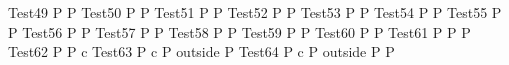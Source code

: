 \documentclass{article}
\begin{document}
\begin{circus}
   \circprocess Test49 \circdef P  P
   \also
   \circprocess Test50 \circdef P  P
   \also
   \circprocess Test51 \circdef P  P
   \also
   \circprocess Test52 \circdef P  P
   \also
   \circprocess Test53 \circdef P  P
   \also
   \circprocess Test54 \circdef P  P
   \also
   \circprocess Test55 \circdef P  P
   \also
   \circprocess Test56 \circdef P  P
   \also
   \circprocess Test57 \circdef P  P
   \also
   \circprocess Test58 \circdef P  P
   \also
   \circprocess Test59 \circdef P  P
   \also
   \circprocess Test60 \circdef P \circtimedinterrupt {\lcirctime 1 \upto 20  \rcirctime} P
   \also
   \circprocess Test61 \circdef  P \circseq P  P
   \also
   \circprocess Test62 \circdef P   P  
   \circhide \lchanset c \rchanset
   \also
   \circprocess Test63 \circdef  P \lpar \lchanset c \rchanset \rpar P \circtimedinterrupt  
   {\lcirctime outside \rcirctime} P
   \also
   \circprocess Test64 \circdef  P \lpar \lchanset c \rchanset \rpar P \circtimedinterrupt  
   {\lcirctime outside \rcirctime} P  P 
\end{circus}
\end{document}
